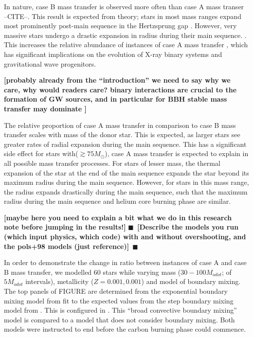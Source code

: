 \documentclass[twocolumn]{aastex63}
\newcommand{\todo}[1]{{\large $\blacksquare$~\textbf{\color{red}[#1]}}~$\blacksquare$}
\newcommand{\mr}[1]{{\textbf{\color{green!75!black}[#1]}}}
\begin{document}
In nature, case B mass transfer is observed more often than case A
mass transer --CITE--. This result is expected from theory; stars in
most mass ranges expand most prominently post-main sequence in the
Hertzsprung gap \citep{vandenheuvel:69}. However, very massive stars
undergo a drastic expansion in radius during their main
sequence. \citep[e.g.,][]{brott:11}. This increases the relative
abundance of instances of case A mass transfer \citep{demink:08}, which has significant implications on the evolution of X-ray binary systems and gravitational wave progenitors.

\mr{probably already from the ``introduction'' we need to say why we
  care, why would readers care? binary interactions are crucial to the
formation of GW sources, and in particular for BBH stable mass
transfer may dominate \cite{marchant:21, vanson:21}}

The relative proportion of case A mass transfer in comparison to case
B mass transfer scales with mass of the donor star. This is expected,
as larger stars see greater rates of radial expansion during the main
sequence. This has a significant side effect for stars with($\gtrsim 75M_{\odot}$), case A mass transfer is expected to explain
in all possible mass transfer processes. For stars of lesser mass, the
thermal expansion of the star at the end of the main sequence expands
the star beyond its maximum radius during the main sequence. However,
for stars in this mass range, the radius expands drastically during
the main sequence, such that the maximum radius during the main
sequence and helium core burning phase are similar.

\mr{maybe here you need to explain a bit what we do in this research
  note before jumping in the results!}  \todo{Describe the models you
  run (which input physics, which code) with and without overshooting,
  and the pols+98 models (just reference)}

In order to demonstrate the change in ratio between instances of case
A and case B mass transfer, we modelled 60 stars while varying mass
($30-100 M_{odot}$; of $5M_{odot}$ intervals), metallicity
($Z = 0.001,0.001$) and model of boundary mixing. The top panels of FIGURE are determined from the exponential boundary mixing model from \cite{04} fit to the expected values from the step boundary mixing model from \cite{brott:11}. This is configured in \cite{claret:18}. This ``broad convective boundary mixing'' model is compared to a model that does not consider boundary mixing. Both models were instructed to end before the carbon burning phase could commence.
\end{document}
